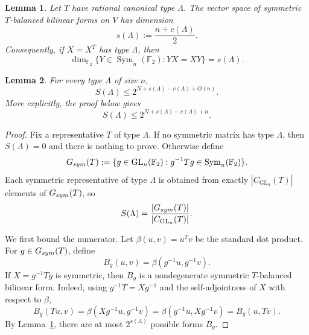 \documentclass[10pt,a4paper]{amsart}
\newtheorem{lemma}{Lemma}
\newcommand{\F}{\mathbb F}
\newcommand{\GL}{\operatorname{GL}}
\newcommand{\Sym}{\operatorname{Sym}}
\begin{document}
\begin{lemma}\label{lem:balanced-dimension-lambda}
Let $T$ have rational canonical type $\Lambda$.  The vector space of symmetric $T$-balanced bilinear forms on $V$ has dimension
\[
        s(\Lambda):=\frac{n+c(\Lambda)}2.
\]
Consequently, if $X=X^T$ has type $\Lambda$, then
\[
        \dim_{\F_2}\{Y\in\Sym_n(\F_2):YX=XY\}=s(\Lambda).
\]
\end{lemma}

\begin{lemma}\label{lem:symmetric-type-bound}
For every type $\Lambda$ of size $n$,
\[
        S(\Lambda)\leq 2^{N+s(\Lambda)-c(\Lambda)+O(n)}.
\]
More explicitly, the proof below gives
\[
        S(\Lambda)\leq 2^{N+s(\Lambda)-c(\Lambda)+n}.
\]
\end{lemma}

\begin{proof}
Fix a representative $T$ of type $\Lambda$.  If no symmetric matrix has type $\Lambda$, then $S(\Lambda)=0$ and there is nothing to prove.  Otherwise define
\[
        G_{\rm sym}(T):=\{g\in\GL_n(\F_2):g^{-1}Tg\in\Sym_n(\F_2)\}.
\]
Each symmetric representative of type $\Lambda$ is obtained from exactly $|C_{\GL_n}(T)|$ elements of $G_{\rm sym}(T)$, so
\begin{equation}\label{eq:S-lambda-quotient}
        S(\Lambda)=\frac{|G_{\rm sym}(T)|}{|C_{\GL_n}(T)|}.
\end{equation}

We first bound the numerator.  Let $\beta(u,v)=u^Tv$ be the standard dot product.  For $g\in G_{\rm sym}(T)$, define
\[
        B_g(u,v)=\beta(g^{-1}u,g^{-1}v).
\]
If $X=g^{-1}Tg$ is symmetric, then $B_g$ is a nondegenerate symmetric $T$-balanced bilinear form.  Indeed, using $g^{-1}T=Xg^{-1}$ and the self-adjointness of $X$ with respect to $\beta$,
\[
        B_g(Tu,v)=\beta(Xg^{-1}u,g^{-1}v)
        =\beta(g^{-1}u,Xg^{-1}v)=B_g(u,Tv).
\]
By Lemma~\ref{lem:balanced-dimension-lambda}, there are at most $2^{s(\Lambda)}$ possible forms $B_g$.


\end{proof}
\end{document}
